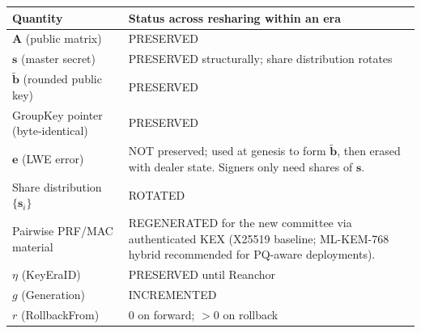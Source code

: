 \begin{tabular}{@{}p{}p{}@{}}
  \toprule
  \textbf{Quantity} & \textbf{Status across resharing within an era} \\
  \midrule
  $\mathbf{A}$ (public matrix) & PRESERVED \\
  $\mathbf{s}$ (master secret) & PRESERVED structurally; share distribution rotates \\
  $\tilde{\mathbf{b}}$ (rounded public key) & PRESERVED \\
  GroupKey pointer (byte-identical) & PRESERVED \\
  $\mathbf{e}$ (LWE error) & NOT preserved; used at genesis to form $\tilde{\mathbf{b}}$, then erased with dealer state. Signers only need shares of $\mathbf{s}$. \\
  Share distribution $\{\mathbf{s}_i\}$ & ROTATED \\
  Pairwise PRF/MAC material & REGENERATED for the new committee via authenticated KEX (X25519 baseline; ML-KEM-768 hybrid recommended for PQ-aware deployments). \\
  $\eta$ (KeyEraID) & PRESERVED until Reanchor \\
  $g$ (Generation) & INCREMENTED \\
  $r$ (RollbackFrom) & 0 on forward; $>0$ on rollback \\
  \bottomrule
\end{tabular}
